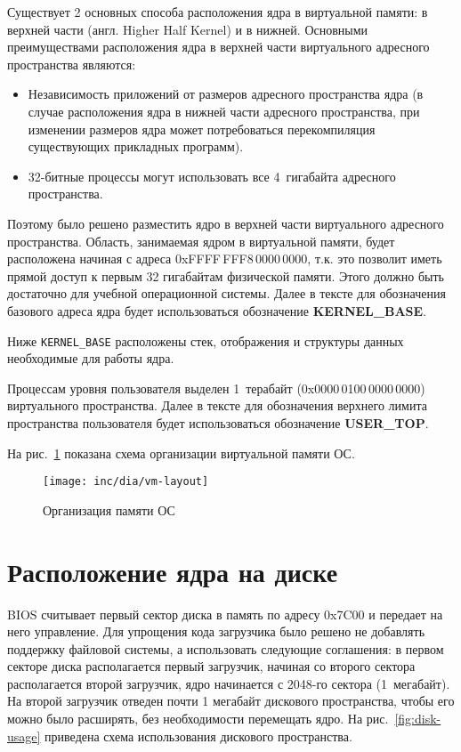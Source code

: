 Существует 2 основных способа расположения ядра в виртуальной памяти: в верхней части (англ. Higher Half Kernel)
и в нижней. Основными преимуществами расположения ядра в верхней части виртуального адресного пространства являются:
\begin{itemize}
\item Независимость приложений от размеров адресного пространства ядра (в случае расположения ядра в нижней части
	адресного пространства, при изменении размеров ядра может потребоваться перекомпиляция существующих
	прикладных программ).
\item 32-битные процессы могут использовать все 4~гигабайта адресного пространства.
\end{itemize}

Поэтому было решено разместить ядро в верхней части виртуального адресного пространства. Область, занимаемая
ядром в виртуальной памяти, будет расположена начиная с адреса 0xFFFF\,FFF8\,0000\,0000, т.к. это
позволит иметь прямой доступ к первым 32 гигабайтам физической памяти. Этого должно быть достаточно для
учебной операционной системы. Далее в тексте для обозначения базового адреса ядра будет использоваться
обозначение \textbf{KERNEL\_BASE}.

Ниже \texttt{KERNEL\_BASE} расположены стек, отображения и структуры данных необходимые для
работы ядра.

Процессам уровня пользователя выделен 1~терабайт (0x0000\,0100\,0000\,0000) виртуального пространства.
Далее в тексте для обозначения верхнего лимита пространства пользователя будет использоваться
обозначение \textbf{USER\_TOP}.

На рис.~\ref{fig:vm-layout} показана схема организации виртуальной памяти ОС.
\begin{figure}[ht!]
  \centering
  \texttt{[image: inc/dia/vm-layout]}
  \caption{Организация памяти ОС}
  \label{fig:vm-layout}
\end{figure}

\section{Расположение ядра на диске}
BIOS считывает первый сектор диска в память по адресу 0x7C00 и передает на него управление.
Для упрощения кода загрузчика было решено не добавлять поддержку файловой системы, а
использовать следующие соглашения: в первом секторе диска располагается первый
загрузчик, начиная со второго сектора располагается второй загрузчик, ядро начинается
с 2048-го сектора (1~мегабайт). На второй загрузчик отведен почти
1 мегабайт дискового пространства, чтобы его можно было расширять, без необходимости перемещать
ядро. На рис.~\ref{fig:disk-usage} приведена схема использования дискового пространства.


